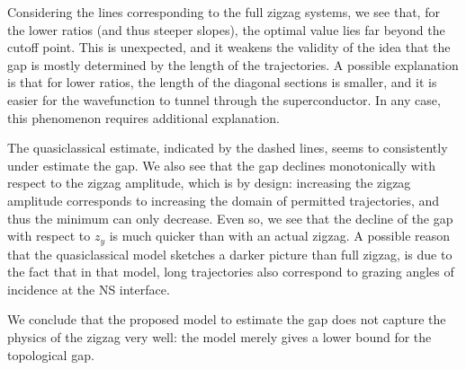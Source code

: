 			Considering the lines corresponding to the full zigzag systems, we see that, for the lower ratios (and thus steeper slopes), the optimal value lies far beyond the cutoff point.
			This is unexpected, and it weakens the validity of the idea that the gap is mostly determined by the length of the trajectories.
			A possible explanation is that for lower ratios, the length of the diagonal sections is smaller, and  it is easier for the wavefunction to tunnel through the superconductor.
			In any case, this phenomenon requires additional explanation.

			The quasiclassical estimate, indicated by the dashed lines, seems to consistently under estimate the gap.
			We also see that the gap declines monotonically with respect to the zigzag amplitude, which is by design: increasing the zigzag amplitude corresponds to increasing the domain of permitted trajectories, and thus the minimum can only decrease.
			Even so, we see that the decline of the gap with respect to $z_y$ is much quicker than with an actual zigzag.
			A possible reason that the quasiclassical model sketches a darker picture than full zigzag, is due to the fact that in that model, long trajectories also correspond to grazing angles of incidence at the NS interface.

			We conclude that the proposed model to estimate the gap does not capture the physics of the zigzag very well: the model merely gives a lower bound for the topological gap.
			